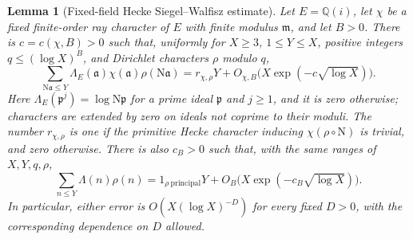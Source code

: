 \documentclass[11pt]{article}
\newtheorem{lemma}[theorem]{Lemma}
\theoremstyle{definition}
\theoremstyle{remark}
\newcommand{\Q}{\mathbb Q}
\begin{document}
\begin{lemma}[Fixed-field Hecke Siegel--Walfisz estimate]
\label{lem:gaussian-hecke-sw}
Let $E=\Q(i)$, let $\chi$ be a fixed finite-order ray character of $E$
with finite modulus $\mathfrak m$, and let $B>0$.
There is $c=c(\chi,B)>0$ such that, uniformly for $X\geq3$,
$1\leq Y\leq X$, positive integers $q\leq(\log X)^B$, and Dirichlet
characters $\rho$ modulo $q$,
\begin{equation}\label{eq:gaussian-hecke-sw-estimate}
 \sum_{\mathrm N\mathfrak a\leq Y}
   \Lambda_E(\mathfrak a)\chi(\mathfrak a)\rho(\mathrm N\mathfrak a)
 =r_{\chi,\rho}Y+
 O_{\chi,B}\bigl(X\exp(-c\sqrt{\log X})\bigr).
\end{equation}
Here $\Lambda_E(\mathfrak p^j)=\log\mathrm N\mathfrak p$ for a prime
ideal $\mathfrak p$ and $j\geq1$, and it is zero otherwise; characters
are extended by zero on ideals not coprime to their moduli.
The number $r_{\chi,\rho}$ is one if the primitive Hecke character
inducing $\chi(\rho\circ\mathrm N)$ is trivial, and zero otherwise.
There is also $c_B>0$ such that, with the same ranges of $X,Y,q,\rho$,
\begin{equation}\label{eq:rational-sw-estimate}
 \sum_{n\leq Y}\Lambda(n)\rho(n)
 =1_{\rho\ \mathrm{principal}}Y+
 O_B\bigl(X\exp(-c_B\sqrt{\log X})\bigr).
\end{equation}
In particular, either error is $O(X(\log X)^{-D})$ for every fixed
$D>0$, with the corresponding dependence on $D$ allowed.
\end{lemma}
\end{document}
